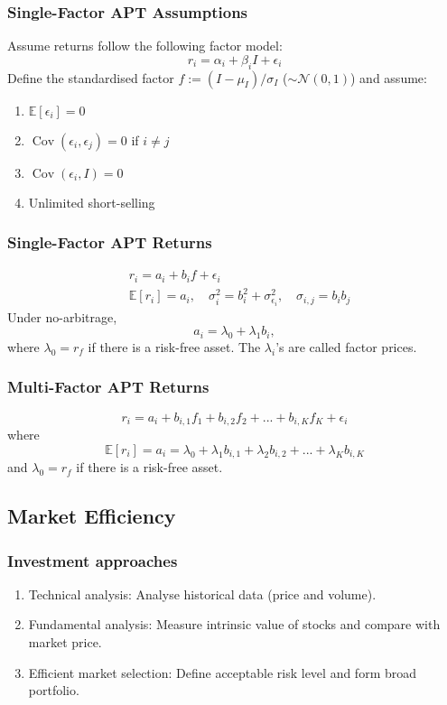 \documentclass[11pt]{article}
\newcommand{\E}{\mathbb{E}}
\newcommand{\Cov}{\operatorname{Cov}}
\begin{document}
	\subsubsection{Single-Factor APT Assumptions}
	Assume returns follow the following factor model:
		\[	r_i = \alpha_i + \beta_{i}I+\epsilon_{i}\]
	Define the standardised factor \( f:=(I - \mu_{I})/\sigma_{I} \) (\( \sim\mathcal{N}(0,1) \)) and assume:
	\begin{enumerate}
		\item \( \E[\epsilon_i] = 0 \)
		\item \( \Cov(\epsilon_i, \epsilon_j) = 0\) if \( i\neq j \)
		\item \( \Cov(\epsilon_i, I) = 0\)
		\item Unlimited short-selling
	\end{enumerate}
	\subsubsection{Single-Factor APT Returns}
	\begin{align*}
		& r_i = a_i + b_i f + \epsilon_i\\[5pt]
		& \E[r_i] = a_i,\quad \sigma_i^2 = b_i^2 + \sigma_{\epsilon_i}^2,\quad\sigma_{i, j} = b_{i}b_{j}
	\end{align*}
	Under no-arbitrage, 
	\[	a_i = \lambda_0 + \lambda_1 b_i,\]
	where \( \lambda_0 = r_f \) if there is a risk-free asset. The \( \lambda_i \)'s are called factor prices.
	\subsubsection{Multi-Factor APT Returns}
	\[	r_i = a_i + b_{i,1 }f_1 + b_{i,2} f_2 + ... + b_{i, K}f_K + \epsilon_i\]
	where
	\[	\E[r_i] = a_i = \lambda_0 + \lambda_1 b_{i,1} + \lambda_2 b_{i, 2} + ... + \lambda_K b_{i, K}\]
	and \( \lambda_0 = r_f \) if there is a risk-free asset. 
	\subsection{Market Efficiency}
	\subsubsection{Investment approaches}
	\begin{enumerate}
		\item Technical analysis: Analyse historical data (price and volume).
		\item Fundamental analysis: Measure intrinsic value of stocks and compare with market price.
		\item Efficient market selection: Define acceptable risk level and form broad portfolio.
	\end{enumerate}
\end{document}

